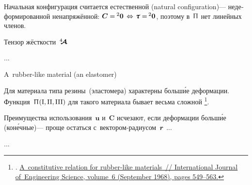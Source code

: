 \begin{otherlanguage}{russian}

\noindent
Начальная конфигурация
считается
естественной (natural configuration)\:---
недеформированной ненапряжённой\::
${\bm{C} = \hspace{-0.1ex} \zerobivalent \hspace{.4ex} \Leftrightarrow \hspace{.2ex} \cauchystress
= \hspace{-0.2ex} \zerobivalent}$,
поэтому
в~$\Uppi$
нет линейных членов.

Тензор жёсткости~$\hspace{.08ex}{^4\hspace{-0.7ex}\bm{\mathcal{A}}}\hspace{.08ex}$

...

A~rubber\hbox{-}like material (an elastomer)

Для материала типа резины~(эластомера)
характерны больш\'{и}е деформации.
Функция~${\Uppi\hspace{.12ex}(\mathrm{I}, \mathrm{II}, \mathrm{III})}$
для такого материала
бывает весьма сложной%
\footnote{. \href{https://kundoc.com/pdf-a-constitutive-relation-for-rubber-like-materials-.html}{A~constitutive relation for rubber-like ma\-te\-ri\-als~// International Journal of~Engineering Science, volume~6 (September 1968), pages 549\hbox{--}563.}}\hbox{\hspace{-0.5ex}.}

Преимущества использования~$\bm{u}$ и~$\bm{C}$
исчезают,
если деформации
больш\'{и}е (кон\'{е}чные)\:---
проще остаться с~вектором\hbox{-}радиусом~$\bm{r}$ ...

...


\end{otherlanguage}

\newpage



\label{section:piolakirchhoffstresstensor}

